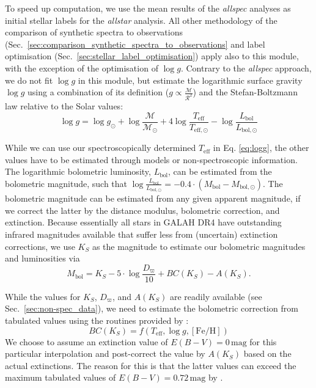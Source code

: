 \documentclass[
  journal=pasa,
  manuscript=research-paper, %
  year=2023,
  volume=37
]{cup-journal}
\newcommand{\logg}{$\log g$\xspace}
\begin{document}
To speed up computation, we use the mean results of the \textit{allspec} analyses as initial stellar labels for the \textit{allstar} analysis. All other methodology of the comparison of synthetic spectra to observations (Sec.~\ref{sec:comparison_synthetic_spectra_to_observations} and label optimisation (Sec.~\ref{sec:stellar_label_optimisation}) apply also to this module, with the exception of the optimisation of \logg. Contrary to the \textit{allspec} approach, we do not fit \logg in this module, but estimate the logarithmic surface gravity $\log g$ using a combination of its definition ($g \propto \frac{\mathcal{M}}{\mathcal{R}^2}$) and the Stefan-Boltzmann law relative to the Solar values:
\begin{equation}
\log g = \log g_\odot + \log \frac{\mathcal{M}}{\mathcal{M_\odot}} + 4 \log \frac{T_\mathrm{eff}}{T_\mathrm{eff,\odot}} - \log \frac{L_\mathrm{bol}}{L_\mathrm{bol,\odot}} \label{eq:logg}
\end{equation}

While we can use our spectroscopically determined $T_\mathrm{eff}$ in Eq. \ref{eq:logg}, the other values have to be estimated through models or non-spectroscopic information. The logarithmic bolometric luminosity, $L_\mathrm{bol}$, can be estimated from the bolometric magnitude, such that $\log \frac{L_\mathrm{bol}}{L_\mathrm{bol,\odot}} = -0.4 \cdot \left(M_\mathrm{bol} - M_\mathrm{bol,\odot} \right)$. The bolometric magnitude can be estimated from any given apparent magnitude, if we correct the latter by the distance modulus, bolometric correction, and extinction. Because essentially all stars in GALAH DR4 have outstanding infrared magnitudes available that suffer less from (uncertain) extinction corrections, we use $K_S$ as the magnitude to estimate our bolometric magnitudes and luminosities via
\begin{equation}
M_\mathrm{bol} = K_S - 5\cdot \log \frac{D_\varpi}{10} + BC(K_S) - A(K_S). \label{eq:mbol}
\end{equation}

While the values for $K_S$, $D_\varpi$, and $A(K_S)$ are readily available (see Sec.~\ref{sec:non-spec_data}), we need to estimate the bolometric correction from tabulated values using the routines provided by \citet{Casagrande2018}:
\begin{equation}
BC(K_S) = f(T_\mathrm{eff}, \log g, \mathrm{[Fe/H]})
\label{eq:bc_ks}
\end{equation}
We choose to assume an extinction value of $E(B-V) = 0\,\mathrm{mag}$ for this particular interpolation and post-correct the value by $A(K_S)$ based on the actual extinctions. The reason for this is that the latter values can exceed the maximum tabulated values of $E(B-V) = 0.72\,\mathrm{mag}$ by \citet{Casagrande2018}.
\end{document}

